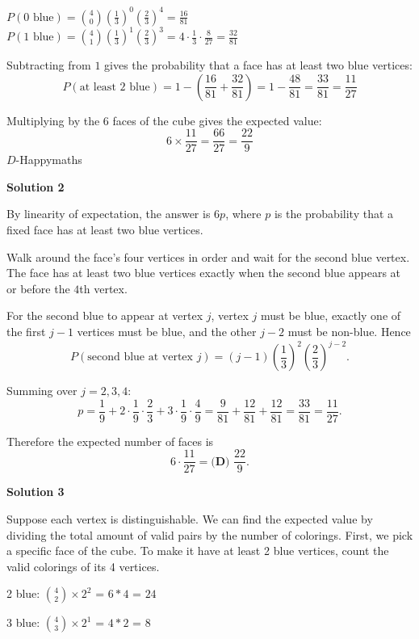 \begin{enumerate}
 
$P(0 \text{ blue}) = \binom{4}{0} \left(\frac{1}{3}\right)^0 \left(\frac{2}{3}\right)^4 = \frac{16}{81}$
$P(1 \text{ blue}) = \binom{4}{1} \left(\frac{1}{3}\right)^1 \left(\frac{2}{3}\right)^3 = 4 \cdot \frac{1}{3} \cdot \frac{8}{27} = \frac{32}{81}$

 
Subtracting from $1$ gives the probability that a face has at least two blue vertices:
 \[P(\text{at least } 2 \text{ blue}) = 1 - \left(\frac{16}{81} + \frac{32}{81}\right) = 1 - \frac{48}{81} = \frac{33}{81} = \frac{11}{27}\]

 Multiplying by the $6$ faces of the cube gives the expected value:
 \[6 \times \frac{11}{27} = \frac{66}{27} = \frac{22}{9}\] $\boxed{D}$-Happymaths

 



\textbf{Solution 2}

By linearity of expectation, the answer is $6p$, where $p$ is the probability that a fixed face has at least two blue vertices.

 Walk around the face's four vertices in order and wait for the second blue vertex. The face has at least two blue vertices exactly when the second blue appears at or before the $4$th vertex.

 For the second blue to appear at vertex $j$, vertex $j$ must be blue, exactly one of the first $j-1$ vertices must be blue, and the other $j-2$ must be non-blue. Hence
 \[P(\text{second blue at vertex } j) = (j-1)\left(\frac{1}{3}\right)^2\left(\frac{2}{3}\right)^{j-2}.\]

 Summing over $j = 2, 3, 4$:
 \[p = \frac{1}{9} + 2\cdot\frac{1}{9}\cdot\frac{2}{3} + 3\cdot\frac{1}{9}\cdot\frac{4}{9} = \frac{9}{81} + \frac{12}{81} + \frac{12}{81} = \frac{33}{81} = \frac{11}{27}.\]

 Therefore the expected number of faces is
 \[6\cdot\frac{11}{27} = \boxed{\textbf{(D) }\frac{22}{9}}.\]




\textbf{Solution 3}

Suppose each vertex is distinguishable. We can find the expected value by dividing the total amount of valid pairs by the number of colorings. First, we pick a specific face of the cube. To make it have at least 2 blue vertices, count the valid colorings of its 4 vertices.

 2 blue: $\binom{4}{2} \times 2^2$ = $6*4$ = $24$

 3 blue: $\binom{4}{3} \times 2^1$ = $4*2$ = $8$


\end{enumerate}
